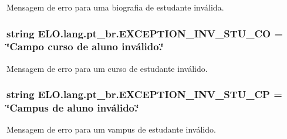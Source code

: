 Mensagem de erro para uma biografia de estudante inválida. 

\hypertarget{namespaceELO_1_1lang_1_1pt__br_a01d98907a99d20db757c8e9794138525}{
\subsubsection[{E\-X\-C\-E\-P\-T\-I\-O\-N\-\_\-\-I\-N\-V\-\_\-\-S\-T\-U\-\_\-\-C\-O}]{\setlength{\rightskip}{0pt plus 5cm}string E\-L\-O.\-lang.\-pt\-\_\-br.\-E\-X\-C\-E\-P\-T\-I\-O\-N\-\_\-\-I\-N\-V\-\_\-\-S\-T\-U\-\_\-\-C\-O = \char`\"{}Campo curso de aluno inválido.\char`\"{}}}\label{d5/d70/namespaceELO_1_1lang_1_1pt__br_a01d98907a99d20db757c8e9794138525}


Mensagem de erro para um curso de estudante inválido. 

\hypertarget{namespaceELO_1_1lang_1_1pt__br_aa53f08869c52a18d80e91d5f99ae78d2}{
\subsubsection[{E\-X\-C\-E\-P\-T\-I\-O\-N\-\_\-\-I\-N\-V\-\_\-\-S\-T\-U\-\_\-\-C\-P}]{\setlength{\rightskip}{0pt plus 5cm}string E\-L\-O.\-lang.\-pt\-\_\-br.\-E\-X\-C\-E\-P\-T\-I\-O\-N\-\_\-\-I\-N\-V\-\_\-\-S\-T\-U\-\_\-\-C\-P = \char`\"{}Campus de aluno inválido.\char`\"{}}}\label{d5/d70/namespaceELO_1_1lang_1_1pt__br_aa53f08869c52a18d80e91d5f99ae78d2}


Mensagem de erro para um vampus de estudante inválido. 

